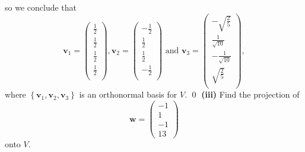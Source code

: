 \documentclass{article}
\begin{document}
so we conclude that
\[{{\mathbf{v}}_{1}}=\left( \begin{matrix}
   \frac{1}{2}  \\
   \frac{1}{2}  \\
   \frac{1}{2}  \\
   \frac{1}{2}  \\
\end{matrix} \right),{{\mathbf{v}}_{2}}=\left( \begin{matrix}
   -\frac{1}{2}  \\
   \frac{1}{2}  \\
   \frac{1}{2}  \\
   -\frac{1}{2}  \\
\end{matrix} \right)\text{ and }{{\mathbf{v}}_{3}}=\left( \begin{matrix}
   -\sqrt{\frac{2}{5}}  \\
   \frac{1}{\sqrt{10}}  \\
   -\frac{1}{\sqrt{10}}  \\
   \sqrt{\frac{2}{5}}  \\
\end{matrix} \right),\] where $\left\{\mathbf{v}_1,\mathbf{v}_2,\mathbf{v}_3\right\}$ is an orthonormal basis for $V$. \qed
\newline
\newline\textbf{(iii)} Find the projection of \[\mathbf{w}=\begin{pmatrix}-1\\1\\-1\\13\end{pmatrix}\] onto $V$.
\newline
\end{document}
